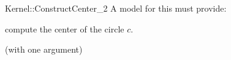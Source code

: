 \begin{ccRefFunctionObjectConcept}{Kernel::ConstructCenter_2}
A model for this must provide:


 {compute the center of the circle $c$.}

\ccRefines
{} (with one argument)

\ccSeeAlso
{} \\

\end{ccRefFunctionObjectConcept}
